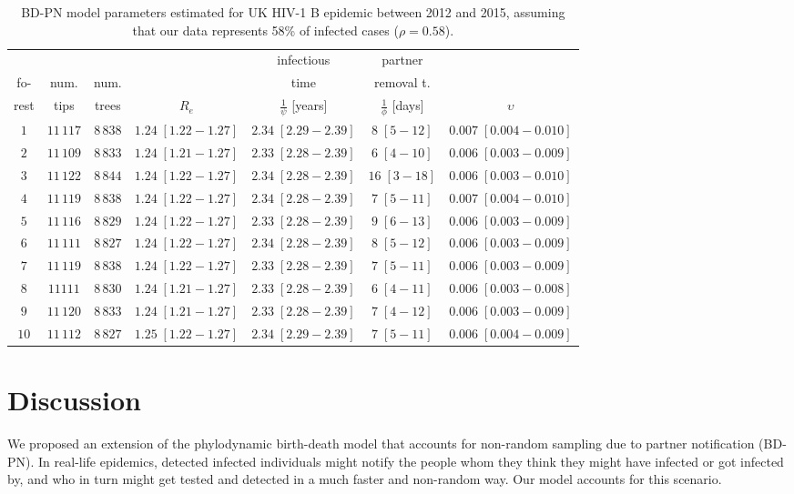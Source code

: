 \documentclass[a4paper,10pt]{article}
\begin{document}
\begin{table}
\caption{BD-PN model parameters estimated for UK HIV-1 B epidemic between 2012 and 2015, assuming that our data represents 58\% of infected cases ($\rho=0.58$).}
\label{tbl:uk}
\begin{tabular}{c|cc|cccc}
&&&&infectious&partner&\\
fo-&num.&num.&&time&removal t.&\\
rest&tips&trees&$R_e$&$\frac{1}{\psi}$ [years]& $\frac{1}{\phi}$ [days]&$\upsilon$\\
\toprule
 $1$ & $11\,117$ & $8\,838$& $1.24\;[1.22-1.27]$& $2.34\;[2.29-2.39]$& $8\;[5-12]$& $0.007\;[0.004-0.010]$ \\
 $2$ & $11\,109$ & $8\,833$& $1.24\;[1.21-1.27]$& $2.33\;[2.28-2.39]$& $6\;[4-10]$& $0.006\;[0.003-0.009]$ \\
 $3$ & $11\,122$ & $8\,844$& $1.24\;[1.22-1.27]$& $2.34\;[2.28-2.39]$& $16\;[3-18]$& $0.006\;[0.003-0.010]$ \\
 $4$ & $11\,119$ & $8\,838$& $1.24\;[1.22-1.27]$& $2.34\;[2.28-2.39]$& $7\;[5-11]$& $0.007\;[0.004-0.010]$ \\
 $5$ & $11\,116$ & $8\,829$& $1.24\;[1.22-1.27]$& $2.33\;[2.28-2.39]$& $9\;[6-13]$& $0.006\;[0.003-0.009]$ \\
 $6$ & $11\,111$ & $8\,827$& $1.24\;[1.22-1.27]$& $2.34\;[2.28-2.39]$& $8\;[5-12]$& $0.006\;[0.003-0.009]$ \\
 $7$ & $11\,119$ & $8\,838$& $1.24\;[1.22-1.27]$& $2.33\;[2.28-2.39]$& $7\;[5-11]$& $0.006\;[0.003-0.009]$ \\
 $8$ & $11111$ & $8\,830$& $1.24\;[1.21-1.27]$& $2.33\;[2.28-2.39]$& $6\;[4-11]$& $0.006\;[0.003-0.008]$ \\
 $9$ & $11\,120$ & $8\,833$& $1.24\;[1.21-1.27]$& $2.33\;[2.28-2.39]$& $7\;[4-12]$& $0.006\;[0.003-0.009]$ \\
 $10$ & $11\,112$ & $8\,827$& $1.25\;[1.22-1.27]$& $2.34\;[2.29-2.39]$& $7\;[5-11]$& $0.006\;[0.004-0.009]$ \\
 \bottomrule
 \end{tabular}
 \end{table}



\section{Discussion}
\label{disc}

We proposed an extension of the phylodynamic birth-death model that accounts for non-random sampling due to partner notification (BD-PN). In real-life epidemics, detected infected individuals might notify the people whom they think they might have infected or got infected by, and who in turn might get tested and detected in a much faster and non-random way. Our model accounts for this scenario.
\end{document}
